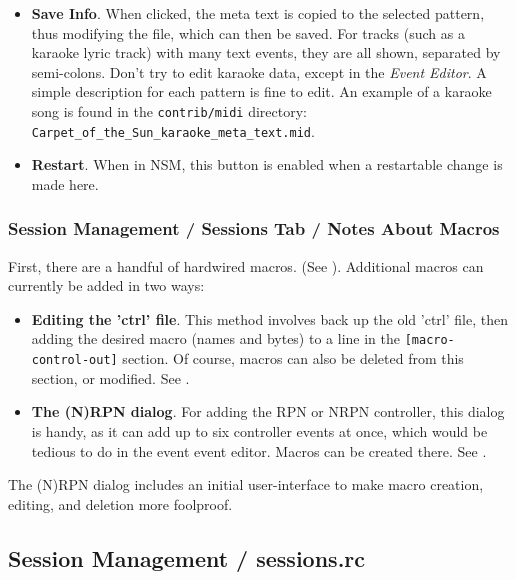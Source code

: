 \begin{itemize}
         in a selected pattern.
      \item \textbf{Save Info}.
         When clicked, the meta text is copied to the selected pattern,
         thus modifying the file, which can then be saved.
         For tracks (such as a karaoke lyric track) with many text events,
         they are all shown, separated by semi-colons.
         Don't try to edit karaoke data, except in the \textsl{Event Editor}.
         A simple description for each pattern is fine to edit.
         An example of a karaoke song is found in the \texttt{contrib/midi}
         directory:
         \texttt{Carpet\_of\_the\_Sun\_karaoke\_meta\_text.mid}.
      \item \textbf{Restart}.
         When in NSM, this button is enabled when a restartable change is
         made here.
   \end{itemize}

\subsubsection{Session Management / Sessions Tab / Notes About Macros}

   First, there are a handful of hardwired macros.
   (See ).
   Additional macros can currently be added in two ways:

   \begin{itemize}
      \item \textbf{Editing the 'ctrl' file}.
         This method involves back up the old 'ctrl' file, then
         adding the desired macro (names and bytes) to a line in the
         \texttt{[macro-control-out]} section.
         Of course, macros can also be deleted from this section,
         or modified.
         See .
      \item \textbf{The (N)RPN dialog}.
         For adding the RPN or NRPN controller, this dialog is handy,
         as it can add up to six controller events at once, which would
         be tedious to do in the event event editor.
         Macros can be created there.
         See .
   \end{itemize}

   The (N)RPN dialog includes an initial user-interface to make
   macro creation, editing, and deletion more foolproof.

\subsection{Session Management / sessions.rc}
\label{subsec:sessions_sessions_rc}


